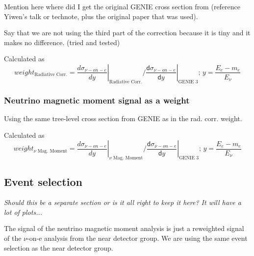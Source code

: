 Mention here where did I get the original GENIE cross section from (reference Yiwen's talk or technote, plus the original paper that was used).


Say that we are not using the third part of the correction because it is tiny and it makes no difference. (tried and tested)

Calculated as 
\begin{equation}
weight_{\text{Radiative Corr.}} = \left.\frac{d\sigma_{\nu-on-e}}{dy}\right|_{\text{Radiative Corr.}} / \left.\frac{\textsf{d}\sigma_{\nu-on-e}}{\textsf{d}y}\right|_{\text{GENIE 3}};\,y=\frac{E_e-m_e}{E_\nu}
\end{equation}

\subsubsection{Neutrino magnetic moment signal as a weight}

Using the same tree-level cross section from GENIE as in the rad. corr. weight.


Calculated as 
\begin{equation}
weight_{\nu\text{ Mag. Moment}} = \left.\frac{d\sigma_{\nu-on-e}}{dy}\right|_{\nu\text{ Mag. Moment}} / \left.\frac{\textsf{d}\sigma_{\nu-on-e}}{\textsf{d}y}\right|_{\text{GENIE 3}};\,y=\frac{E_e-m_e}{E_\nu}
\end{equation}

\subsection{Event selection}
\textit{Should this be a separate section or is it all right to keep it here? It will have a lot of plots...}

The signal of the neutrino magnetic moment analysis is just a reweighted signal of the $\nu$-on-e analysis from the near detector group. We are using the same event selection as the near detector group.

